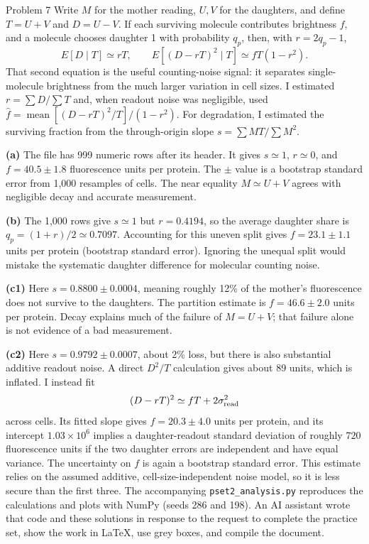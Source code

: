 \documentclass[12pt,a4paper]{article}
\begin{document}
\begin{solution}{Problem 7}
Write $M$ for the mother reading, $U,V$ for the daughters, and define
$T=U+V$ and $D=U-V$. If each surviving molecule contributes brightness
$f$, and a molecule chooses daughter 1 with probability $q_p$, then,
with $r=2q_p-1$,
\[
 E[D\mid T]\simeq rT,\qquad
 E[(D-rT)^2\mid T]\simeq fT(1-r^2).
\]
That second equation is the useful counting-noise signal: it separates
single-molecule brightness from the much larger variation in cell sizes.
I estimated $r=\sum D/\sum T$ and, when readout noise was negligible,
used $\widehat f=\operatorname{mean}[(D-rT)^2/T]/(1-r^2)$.
For degradation, I estimated the surviving fraction from the
through-origin slope $s=\sum MT/\sum M^2$.

\textbf{(a)} The file has 999 numeric rows after its header. It gives
$s\simeq1$, $r\simeq0$, and
$\boxed{f=40.5\pm1.8}$ fluorescence units per protein.
The $\pm$ value is a bootstrap standard error from 1,000 resamples of cells.
The near equality $M\simeq U+V$ agrees with negligible decay and accurate
measurement.

\textbf{(b)} The 1,000 rows give $s\simeq1$ but $r=0.4194$, so the average
daughter share is $q_p=(1+r)/2\simeq0.7097$. Accounting for this uneven
split gives $\boxed{f=23.1\pm1.1}$ units per protein (bootstrap standard
error). Ignoring the unequal split would mistake the systematic daughter
difference for molecular counting noise.

\textbf{(c1)} Here $s=0.8800\pm0.0004$, meaning roughly 12\% of the
mother's fluorescence does not survive to the daughters. The partition
estimate is $\boxed{f=46.6\pm2.0}$ units per protein. Decay explains much
of the failure of $M=U+V$; that failure alone is not evidence of a bad
measurement.

\textbf{(c2)} Here $s=0.9792\pm0.0007$, about 2\% loss, but there is also
substantial additive readout noise. A direct $D^2/T$ calculation gives
about 89 units, which is inflated. I instead fit
\[
 (D-rT)^2\simeq fT+2\sigma_{\rm read}^2
\]
across cells. Its fitted slope gives $\boxed{f=20.3\pm4.0}$ units per
protein, and its intercept $1.03\times10^6$ implies a daughter-readout
standard deviation of roughly $720$ fluorescence units if the two daughter
errors are independent and have equal variance. The uncertainty on $f$
is again a bootstrap standard error. This estimate relies on the assumed
additive, cell-size-independent noise model, so it is less secure than
the first three.
The accompanying \texttt{pset2\_analysis.py} reproduces the calculations
and plots with NumPy (seeds 286 and 198). An AI assistant wrote that code
and these solutions in response to the request to complete the practice
set, show the work in LaTeX, use grey boxes, and compile the document.
\end{solution}
\end{document}
